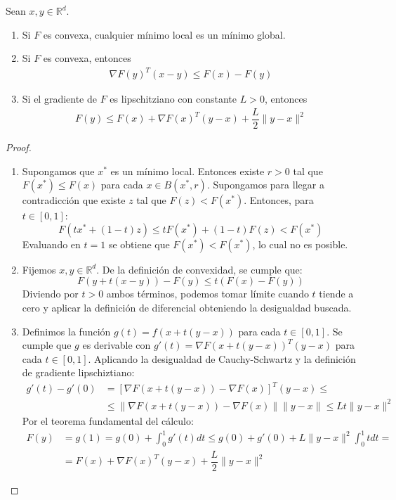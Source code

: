 \begin{lemma}
	\leavevmode
	Sean $x, y \in \mathbb{R}^d$.
	\begin{enumerate}
		\item Si $F$ es convexa, cualquier mínimo local es un mínimo global. 
		\item Si $F$ es convexa, entonces 
		\begin{align}\label{desig-convex}
			\nabla F(y)^T (x-y) \leq F(x) - F(y)
		\end{align}
		\item Si el gradiente de $F$ es lipschitziano con constante $L>0$, entonces 
		\begin{align}\label{desig-lips}
			F(y) \leq F(x) + \nabla F(x)^T(y-x) + \dfrac{L}{2} \| y-x\|^2
		\end{align}
	\end{enumerate}
\end{lemma}
\begin{proof}
	\leavevmode
	\begin{enumerate}
		\item Supongamos que $x^*$ es un mínimo local. Entonces existe $r>0$ tal que $F(x^*) \leq F(x)$ para cada $x \in B(x^*, r)$. Supongamos para llegar a contradicción que existe $z$ tal que $F(z)<F(x^*)$. Entonces, para $t \in [0,1]$:
		$$ F( tx^* + (1-t)z  ) \leq tF(x^*) + (1-t)F(z) < F(x^*) $$
		Evaluando en $t=1$ se obtiene que $F(x^*)<F(x^*)$, lo cual no es posible.
		\item Fijemos $x, y \in \mathbb{R}^d$. De la definición de convexidad, se cumple que:
		$$F(y + t(x-y)) - F(y) \leq t (F(x) - F(y)) $$
		Diviendo por $t>0$ ambos términos, podemos tomar límite cuando $t$ tiende a cero y aplicar la definición de diferencial obteniendo la desigualdad buscada.
		\item Definimos la función $g(t) = f(x + t(y-x))$ para cada $t \in [0,1]$. Se cumple que $g$ es derivable con $g'(t) = \nabla F(x + t(y-x))^T(y-x)$ para cada $t \in [0,1]$. Aplicando la desigualdad de Cauchy-Schwartz y la definición de gradiente lipschiztiano:
		\begin{align*}
			g'(t) - g'(0) & = \left[ \nabla F(x + t(y-x)) - \nabla F(x) \right]^T (y-x) \leq \\
			&\leq  \| \nabla F(x + t(y-x)) - \nabla F(x) \| \| y-x \| \leq L t \| y-x \|^2
	 	\end{align*}
 		Por el teorema fundamental del cálculo:
 		\begin{align*}
 			F(y) & = g(1) = g(0) + \int_{0}^{1}g'(t)dt \leq g(0) + g'(0) + L \| y-x \|^2 \int_{0}^{1}t dt= \\
 			& = F(x) + \nabla F(x)^T(y-x) + \dfrac{L}{2} \| y-x\|^2
 		\end{align*}
	\end{enumerate}
\end{proof}

